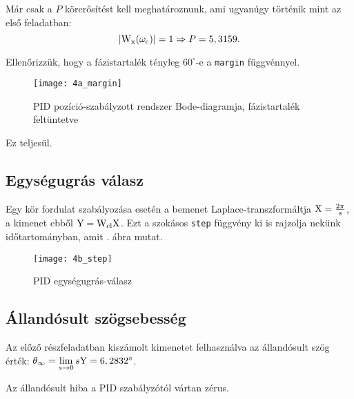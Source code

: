 Már csak a $P$ körerősítést kell meghatároznunk, ami ugyanúgy történik mint az első feladatban:
\begin{equation}
	\left\lvert \mathrm{W}_\text{x}(\omega_\text{c}) \right\rvert = 1 \Rightarrow P = 5,3159.
\end{equation}

Ellenőrizzük, hogy a fázistartalék tényleg $60^\circ$-e a \verb|margin| függvénnyel.
\begin{figure}[H]
	\centering
	\texttt{[image: 4a\_margin]}
	\caption{PID pozíció-szabályzott rendszer Bode-diagramja, fázistartalék feltüntetve}
	\label{fig:4a_margin}
\end{figure}

Ez teljesül.


\subsection{Egységugrás válasz}

Egy kör fordulat szabályozása esetén a bemenet Laplace-transzformáltja $\mathrm{X}=\frac{2\pi}{s}$,
a kimenet ebből $\mathrm{Y} = \mathrm{W}_\text{cl}\mathrm{X}$. Ezt a szokásos \verb|step| függvény
ki is rajzolja nekünk időtartományban, amit . ábra mutat.

\begin{figure}[H]
	\centering
	\texttt{[image: 4b\_step]}
	\caption{PID egységugrás-válasz}
	\label{fig:4b_step}
\end{figure}


\subsection{Állandósult szögsebesség}

Az előző részfeladatban kiszámolt kimenetet felhasználva az állandósult szög érték:
$\theta_\infty = \lim\limits_{s\rightarrow 0}s\mathrm{Y} = 6,2832^\circ$.

Az állandósult hiba a PID szabályzótól vártan zérus.

